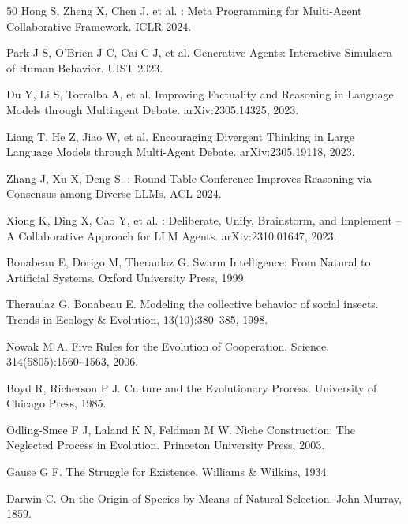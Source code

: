 \documentclass[twocolumn,10.5pt]{ctexart}
\begin{document}
\begin{thebibliography}{50}
Hong S, Zheng X, Chen J, et al.
: Meta Programming for Multi-Agent Collaborative Framework.
\newblock ICLR 2024.

Park J S, O'Brien J C, Cai C J, et al.
\newblock Generative Agents: Interactive Simulacra of Human Behavior.
\newblock UIST 2023.

Du Y, Li S, Torralba A, et al.
\newblock Improving Factuality and Reasoning in Language Models through Multiagent Debate.
\newblock arXiv:2305.14325, 2023.

Liang T, He Z, Jiao W, et al.
\newblock Encouraging Divergent Thinking in Large Language Models through Multi-Agent Debate.
\newblock arXiv:2305.19118, 2023.

Zhang J, Xu X, Deng S.
: Round-Table Conference Improves Reasoning via Consensus among Diverse LLMs.
\newblock ACL 2024.

Xiong K, Ding X, Cao Y, et al.
: Deliberate, Unify, Brainstorm, and Implement -- A Collaborative Approach for LLM Agents.
\newblock arXiv:2310.01647, 2023.

Bonabeau E, Dorigo M, Theraulaz G.
\newblock Swarm Intelligence: From Natural to Artificial Systems.
\newblock Oxford University Press, 1999.

Theraulaz G, Bonabeau E.
\newblock Modeling the collective behavior of social insects.
\newblock Trends in Ecology \& Evolution, 13(10):380--385, 1998.

Nowak M A.
\newblock Five Rules for the Evolution of Cooperation.
\newblock Science, 314(5805):1560--1563, 2006.

Boyd R, Richerson P J.
\newblock Culture and the Evolutionary Process.
\newblock University of Chicago Press, 1985.

Odling-Smee F J, Laland K N, Feldman M W.
\newblock Niche Construction: The Neglected Process in Evolution.
\newblock Princeton University Press, 2003.

Gause G F.
\newblock The Struggle for Existence.
\newblock Williams \& Wilkins, 1934.

Darwin C.
\newblock On the Origin of Species by Means of Natural Selection.
\newblock John Murray, 1859.


\end{thebibliography}
\end{document}
